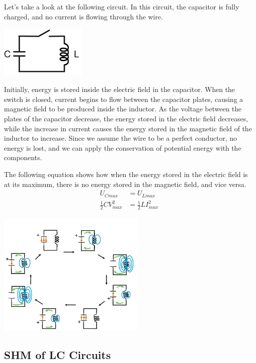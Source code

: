 \documentclass[12pt, titlepage]{article}
\begin{document}
Let's take a look at the following circuit. In this circuit, the capacitor is fully charged, and no current is flowing through the wire. 
\begin{center}
    \includegraphics*[height = 2.5cm]{media/LC.png}
\end{center}

Initially, energy is stored inside the electric field in the capacitor. When the switch is closed, current begins to flow between the capacitor plates, causing a magnetic field to be produced inside the inductor. As the voltage between the plates of the capacitor decrease, the energy stored in the electric field decreases, while the increase in current causes the energy stored in the magnetic field of the inductor to increase. Since we assume the wire to be a perfect conductor, no energy is lost, and we can apply the conservation of potential energy with the components.

The following equation shows how when the energy stored in the electric field is at its maximum, there is no energy stored in the magnetic field, and vice versa.
\begin{align*}
    U_{Cmax} & = U_{Lmax} \\
    \frac{1}{2}CV_{max}^2 &= \frac{1}{2}LI_{max}^2
\end{align*}

\begin{center}
    \includegraphics*[height=6cm]{media/LC_graphic.png}
\end{center}

\subsection*{SHM of LC Circuits}
\end{document}

